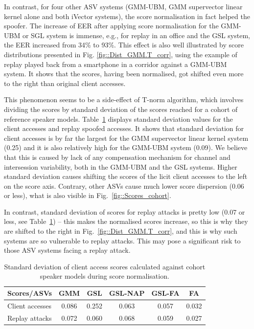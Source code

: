 In contrast, for four other ASV systems (GMM-UBM, GMM supervector linear kernel alone and both iVector systems), the score normalisation in fact helped the spoofer. The increase of EER after applying score normalisation for the GMM-UBM or SGL system is immense, e.g., for replay in an office and the GSL system, the EER increased from 34\% to 93\%. This effect is also well illustrated by score distributions presented in Fig. \ref{fig::Dist_GMM.T_corr}, using the example of replay played back from a smartphone in a corridor against a GMM-UBM system. It shows that the scores, having been normalised, got shifted even more to the right than original client accesses. 

This phenomenon seems to be a side-effect of T-norm algorithm, which involves dividing the scores by standard deviation of the scores reached for a cohort of reference speaker models. Table~\ref{tab::scores_cohort} displays standard deviation values for the client accesses and replay spoofed accesses. It shows that standard deviation for client accesses is by far the largest for the GMM supervector linear kernel system (0.25) and it is also relatively high for the GMM-UBM system (0.09). We believe that this is caused by lack of any compensation mechanism for channel and intersession variability, both in the GMM-UBM and the GSL systems. Higher standard deviation causes shifting the scores of the licit client accesses to the left on the score axis. Contrary, other ASVs cause much lower score dispersion (0.06 or less), what is also visible in Fig.~\ref{fig::Scores_cohort}. 

In contrast, standard deviation of scores for replay attacks is pretty low (0.07 or less, see Table~\ref{tab::scores_cohort}) -- this makes the normalised scores increase, so this is why they are shifted to the right in Fig.~\ref{fig::Dist_GMM.T_corr}, and this is why such systems are so vulnerable to replay attacks. This may pose a significant risk to those ASV systems facing a replay attack.

\begin{table}
\begin{center}
    \begin{tabular}{ l || c c c c c }
    \hline
     	 Scores/ASVs & GMM & GSL & GSL-NAP & GSL-FA & FA\\ 

 \hline \hline
Client accesses & 0.086 & 0.252 & 0.063 & 0.057 & 0.032\\
Replay attacks & 0.072 & 0.060 & 0.068 & 0.059 & 0.027\\
\hline
    \end{tabular}
    \caption{Standard deviation of client access scores calculated against cohort speaker models during score normalisation.}
		\label{tab::scores_cohort}
   \end{center}
\end{table}


